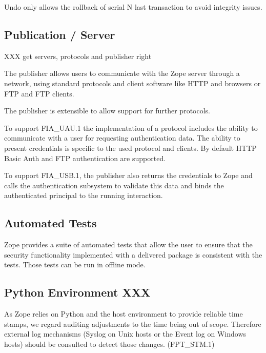 \documentclass[12pt,english]{scrbook}
\begin{document}
Undo only allows the rollback of serial N last transaction to avoid integrity issues.





\subsection{Publication / Server}

XXX get servers, protocols and publisher right

The publisher allows users to communicate with the Zope server through a
network, using standard protocols and client software like HTTP and browsers or
FTP and FTP clients.

The publisher is extensible to allow support for further protocols.

To support FIA{\_}UAU.1 the implementation of a protocol includes the ability to
communicate with a user for requesting authentication data. The ability to
present credentials is specific to the used protocol and clients. By default
HTTP Basic Auth and FTP authentication are supported.

To support FIA{\_}USB.1, the publisher also returns the credentials to Zope and
calls the authentication subsystem to validate this data and binds the
authenticated principal to the running interaction.





\subsection{Automated Tests}

Zope provides a suite of automated tests that allow the user to ensure that the
security functionality implemented with a delivered package is consistent with
the tests. Those tests can be run in offline mode.





\subsection{Python Environment XXX}

As Zope relies on Python and the host environment to provide reliable time
stamps, we regard auditing adjustments to the time being out of scope.
Therefore external log mechanisms (Syslog on Unix hosts or the Event log on
Windows hosts) should be consulted to detect those changes. (FPT{\_}STM.1)
\end{document}
